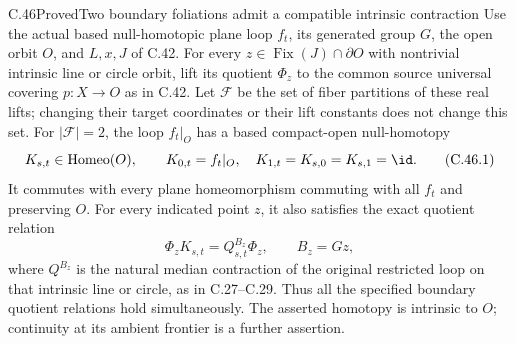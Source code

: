 \begin{claim}{C.46}{Proved}{Two boundary foliations admit a compatible intrinsic contraction}
Use the actual based null-homotopic plane loop $f_t$, its generated group $G$, the
open orbit $O$, and $L,x,J$ of C.42. For every
$z\in\operatorname{Fix}(J)\cap\partial O$ with nontrivial
intrinsic line or circle orbit, lift its quotient $\Phi_z$
to the common source universal covering $p:X\to O$ as in
C.42. Let $\mathscr F$ be the set of fiber partitions of
these real lifts; changing their target coordinates or
their lift constants does not change this set.
For $|\mathscr F|=2$, the loop $f_t|_O$ has a based
compact-open null-homotopy
\[
 K_{s,t}\in\operatorname{Homeo}(O),\qquad
 K_{0,t}=f_t|_O,\quad K_{1,t}=K_{s,0}=K_{s,1}=\id.
                                                        \tag{C.46.1}
\]
It commutes with every plane homeomorphism commuting
with all $f_t$ and preserving $O$. For every indicated
point $z$, it also satisfies the exact quotient relation
\[
                 \Phi_z K_{s,t}=Q^{B_z}_{s,t}\Phi_z,
                  \qquad B_z=Gz,                       \tag{C.46.2}
\]
where $Q^{B_z}$ is the natural median contraction of the
original restricted loop on that intrinsic line or
circle, as in C.27--C.29. Thus all the specified
boundary quotient relations hold simultaneously.
The asserted homotopy is intrinsic to $O$; continuity
at its ambient frontier is a further assertion.
\end{claim}

